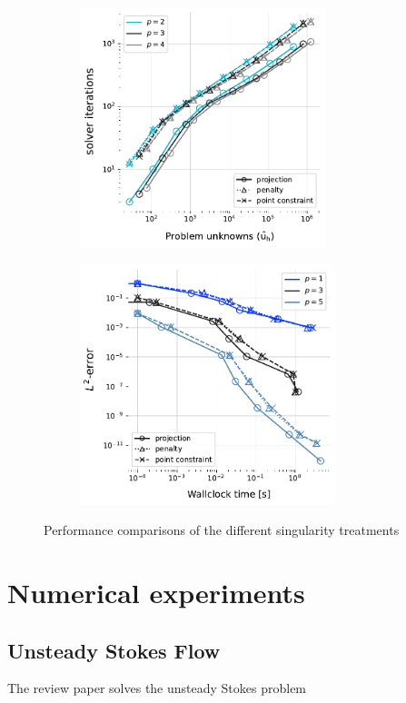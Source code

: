 \begin{figure}[ht]
    \centering
    \begin{subfigure}{0.45\textwidth}
        \includegraphics[height=7cm]{img/PNP_solver_iterations.pdf}
    \end{subfigure}
    \begin{subfigure}{0.45\textwidth}
        \includegraphics[height=7cm]{img/PNP_treatment_wall_times.pdf}
    \end{subfigure}
    \caption{Performance comparisons of the different singularity treatments}
    \label{fig:PNP_treatment_performance}
\end{figure}

\section{Numerical experiments}
\label{sec:numerical_experiments}

\subsection{Unsteady Stokes Flow}

The review paper \cite{guermond_overview_2006} solves the unsteady Stokes problem

